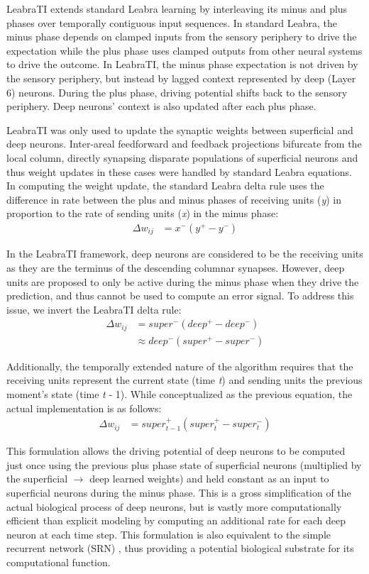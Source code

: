 \documentclass[dwyatte_dissertation.tex]{subfiles}
\begin{document}
LeabraTI extends standard Leabra learning by interleaving its minus and plus phases over temporally contiguous input sequences. In standard Leabra, the minus phase depends on clamped inputs from the sensory periphery to drive the expectation while the plus phase uses clamped outputs from other neural systems to drive the outcome. In LeabraTI, the minus phase expectation is not driven by the sensory periphery, but instead by lagged context represented by deep (Layer 6) neurons. During the plus phase, driving potential shifts back to the sensory periphery. Deep neurons' context is also updated after each plus phase.

LeabraTI was only used to update the synaptic weights between superficial and deep neurons. Inter-areal feedforward and feedback projections bifurcate from the local column, directly synapsing disparate populations of superficial neurons and thus weight updates in these cases were handled by standard Leabra equations. In computing the weight update, the standard Leabra delta rule \cite{OReilly96} uses the difference in rate between the plus and minus phases of receiving units (\textit{y}) in proportion to the rate of sending units (\textit{x}) in the minus phase:
\begin{align*}
\Delta w_{ij} &= x^-(y^+ - y^-)
\end{align*}

In the LeabraTI framework, deep neurons are considered to be the receiving units as they are the terminus of the descending columnar synapses. However, deep units are proposed to only be active during the minus phase when they drive the prediction, and thus cannot be used to compute an error signal.  To address this issue, we invert the LeabraTI delta rule:
\begin{align*}
\Delta w_{ij} &= super^-(deep^+ - deep^-) \\
			  &\approx deep^-(super^+ - super^-)
\end{align*}

Additionally, the temporally extended nature of the algorithm requires that the receiving units represent the current state (time \textit{t}) and sending units the previous moment's state (time \textit{t} - 1). While conceptualized as the previous equation, the actual implementation is as follows:
\begin{align*}
\Delta w_{ij} &= super_{t-1}^+(super_{t}^+ - super_{t}^-)
\end{align*}

This formulation allows the driving potential of deep neurons to be computed just once using the previous plus phase state of superficial neurons (multiplied by the superficial $\rightarrow$ deep learned weights) and held constant as an input to superficial neurons during the minus phase. This is a gross simplification of the actual biological process of deep neurons, but is vastly more computationally efficient than explicit modeling by computing an additional rate for each deep neuron at each time step. This formulation is also equivalent to the simple recurrent network (SRN) \cite{Elman90,Servan-SchreiberCleeremansMcClelland91}, thus providing a potential biological substrate for its computational function. 
\end{document}
